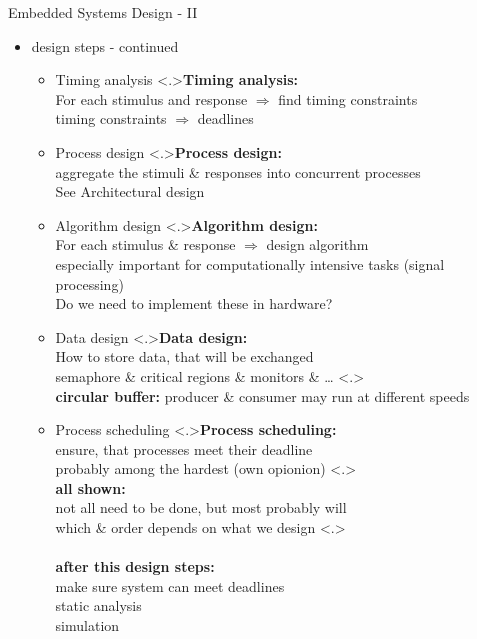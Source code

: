 \documentclass[ngerman={babel}, utf8, bigger, xcolor={table,dvipsnames}, ompress, hyperref={bookmarks,colorlinks}]{beamer}
\begin{document}
\begin{frame}{Embedded Systems Design - II}
	\begin{itemize}
		\item design steps - continued
		\begin{itemize}
			\item Timing analysis
			\note<.>{\textbf{Timing analysis:}\\ For each stimulus and response $\Rightarrow$ find timing constraints \\ timing constraints $\Rightarrow$ deadlines}
			\item Process design
			\note<.>{\textbf{Process design:}\\ aggregate the stimuli \& responses into concurrent processes \\
			See Architectural design}
			\item Algorithm design
			\note<.>{\textbf{Algorithm design:}\\ For each stimulus \& response $\Rightarrow$ design algorithm \\ especially important for computationally intensive tasks (signal processing) \\ Do we need to implement these in hardware?}
			\item Data design
			\note<.>{\textbf{Data design:}\\ How to store data, that will be exchanged \\ semaphore \& critical regions \& monitors \& \dots}
			\note<.>{\\ \textbf{circular buffer:} producer \& consumer may run at different speeds}
			\item Process scheduling
			\note<.>{\textbf{Process scheduling:}\\ ensure, that processes meet their deadline \\ probably among the hardest (own opionion)}
			\note<.>{\ \\ \textbf{all shown:}\\ not all need to be done, but most probably will \\ which \& order depends on what we design }
			\note<.>{\\ \ \\ \textbf{after this design steps:}\\ make sure system can meet deadlines \\ static analysis \\ simulation
			}
		\end{itemize}
	\end{itemize}
\end{frame}
\end{document}
